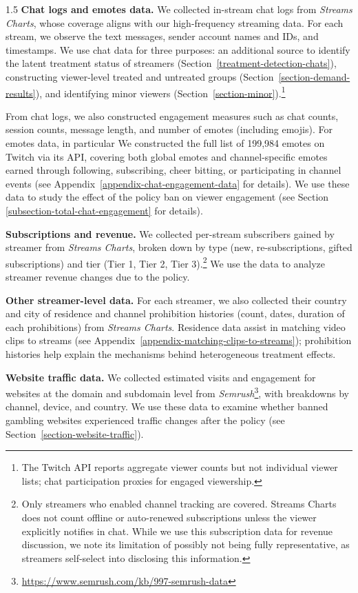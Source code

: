 \documentclass[a4paper,12pt]{article}
\begin{document}
\begin{spacing}{1.5}
\noindent \textbf{Chat logs and emotes data.} We collected in-stream chat logs from \textit{Streams Charts}, whose coverage aligns with our high-frequency streaming data. For each stream, we observe the text messages, sender account names and IDs, and timestamps. We use chat data for three purposes: an additional source to identify the latent treatment status of streamers (Section~\ref{treatment-detection-chats}), constructing viewer-level treated and untreated groups (Section~\ref{section-demand-results}), and identifying minor viewers (Section~\ref{section-minor}).\footnote{The Twitch API reports aggregate viewer counts but not individual viewer lists; chat participation proxies for engaged viewership.}

From chat logs, we also constructed engagement measures such as chat counts, session counts, message length, and number of emotes (including emojis). For emotes data, in particular We
constructed the full list of 199,984 emotes on Twitch via its API, covering both global emotes and channel-specific emotes earned through following, subscribing, cheer bitting, or participating in channel events (see Appendix~\ref{appendix-chat-engagement-data} for details). We use these data to study the effect of the policy ban on viewer engagement (see Section \ref{subsection-total-chat-engagement} for details). 

\noindent \textbf{Subscriptions and revenue.} We collected per-stream subscribers gained by streamer from \textit{Streams Charts}, broken down by type (new, re-subscriptions, gifted subscriptions) and tier (Tier 1, Tier 2, Tier 3).\footnote{Only streamers who enabled channel tracking are covered. Streams Charts does not count offline or auto-renewed subscriptions unless the viewer explicitly notifies in chat. While we use this subscription data for revenue discussion, we note its limitation of possibly not being fully representative, as streamers self-select into disclosing this information.} We use the data to analyze streamer revenue changes due to the policy.

\noindent \textbf{Other streamer-level data.} For each streamer, we also collected their country and city of residence and channel prohibition histories (count, dates, duration of each prohibitions) from \textit{Streams Charts}. Residence data assist in matching video clips to streams (see Appendix~\ref{appendix-matching-clips-to-streams}); prohibition histories help explain the mechanisms behind heterogeneous treatment effects.

\noindent \textbf{Website traffic data.} We collected estimated visits and engagement for websites at the domain and subdomain level from \textit{Semrush}\footnote{\url{https://www.semrush.com/kb/997-semrush-data}}, with breakdowns by channel, device, and country. We use these data to examine whether banned gambling websites experienced traffic changes after the policy (see Section~\ref{section-website-traffic}). 


\end{spacing}
\end{document}
